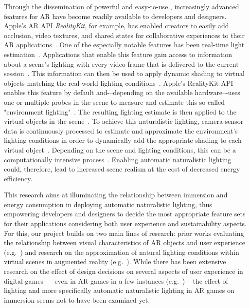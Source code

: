 \documentclass[12pt,twoside,english]{article}
\begin{document}
Through the dissemination of powerful and easy-to-use , increasingly advanced features for \gls{AR} have become readily available to developers and designers.
Apple's \gls{AR} \gls{API} \textit{RealityKit}, for example, has enabled creators to easily add occlusion, video textures, and shared states for collaborative experiences to their \gls{AR} applications~\cite{apple_realitykit_2020-1}.
One of the especially notable features has been real-time light estimation~\cite{apple_arlightestimate_2020}.
Applications that enable this feature gain access to information about a scene's lighting with every video frame that is delivered to the current session~\cite{apple_arlightestimate_2020}.
This information can then be used to apply dynamic shading to virtual objects matching the real-world lighting conditions~\cite{apple_arlightestimate_2020}.
Apple's RealityKit \gls{API} enables this feature by default and-–depending on the available hardware–-uses one or multiple probes in the scene to measure and estimate this so called "environment lighting"~\cite{apple_disablearenvironmentlighting_2020}.
The resulting lighting estimate is then applied to the virtual objects in the scene~\cite{apple_disablearenvironmentlighting_2020}.
To achieve this naturalistic lighting, camera-sensor data is continuously processed to estimate and approximate the environment's lighting conditions in order to dynamically add the appropriate shading to each virtual object~\cite{apple_arlightestimate_2020,apple_disablearenvironmentlighting_2020}.
Depending on the scene and lighting conditions, this can be a computationally intensive process~\cite{steed_constructing_2016}.
Enabling automatic naturalistic lighting could, therefore, lead to increased scene realism at the cost of decreased energy efficiency.

This research aims at illuminating the relationship between immersion and energy consumption in deploying automatic naturalistic lighting, thus empowering developers and designers to decide the most appropriate feature sets for their applications considering both user experience and sustainability aspects.
For this, our project builds on two main lines of research: prior works evaluating the relationship between visual characteristics of \gls{AR} objects and user experience (e.g.~\cite{gabbard_effects_2006}) and research on the approximation of natural lighting conditions within virtual scenes in augmented reality (e.g.~\cite{aittala_inverse_2010}).
While there has been extensive research on the effect of design decisions on several aspects of user experience in digital games~\cite{johnson_validation_2018} -- even in \gls{AR} games in a few instances (e.g.~\cite{georgiou_development_2017}) -- the effect of lighting and more specifically automatic naturalistic lighting in \gls{AR} games on immersion seems not to have been examined yet.
\end{document}
